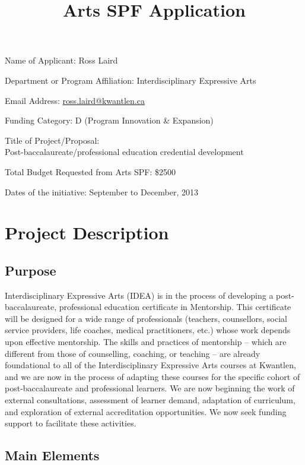 \documentclass[]{article}
\title{Arts SPF Application}
\author{}
\date{}
\begin{document}
\maketitle

Name of Applicant: Ross Laird

Department or Program Affiliation: Interdisciplinary Expressive Arts

Email Address:
\href{mailto:ross.laird@kwantlen.ca}{ross.laird@kwantlen.ca}

Funding Category: D (Program Innovation \& Expansion)

Title of Project/Proposal: \\
Post-baccalaureate/professional education
credential development

Total Budget Requested from Arts SPF: \$2500

Dates of the initiative: September to December, 2013

\section{Project Description}

\subsection{Purpose}

Interdisciplinary Expressive Arts (IDEA) is in the process of developing
a post-baccalaureate, professional education certificate in Mentorship.
This certificate will be designed for a wide range of professionals
(teachers, counsellors, social service providers, life coaches, medical
practitioners, etc.) whose work depends upon effective mentorship. The
skills and practices of mentorship -- which are different from those of
counselling, coaching, or teaching -- are already foundational to all of
the Interdisciplinary Expressive Arts courses at Kwantlen, and we are
now in the process of adapting these courses for the specific cohort of
post-baccalaureate and professional learners. We are now beginning the
work of external consultations, assessment of learner demand, adaptation
of curriculum, and exploration of external accreditation opportunities.
We now seek funding support to facilitate these activities.

\newpage
\subsection{Main Elements}
\end{document}
